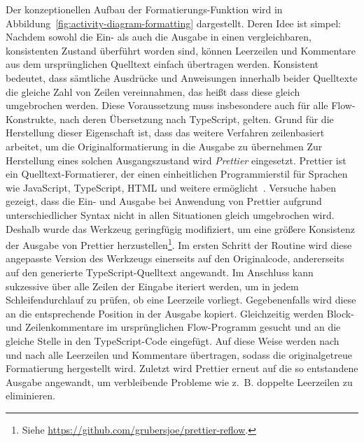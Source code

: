 Der konzeptionellen Aufbau der Formatierungs-Funktion wird in Abbildung~\ref{fig:activity-diagram-formatting} dargestellt. Deren Idee ist simpel: Nachdem sowohl die Ein- als auch die Ausgabe in einen vergleichbaren, konsistenten Zustand überführt worden sind, können Leerzeilen und Kommentare aus dem ursprünglichen Quelltext einfach übertragen werden. Konsistent bedeutet, dass sämtliche Ausdrücke und Anweisungen innerhalb beider Quelltexte die gleiche Zahl von Zeilen vereinnahmen, das heißt dass diese gleich umgebrochen werden. Diese Voraussetzung muss insbesondere auch für alle Flow-Konstrukte, nach deren Übersetzung nach TypeScript, gelten.
Grund für die Herstellung dieser Eigenschaft ist, dass das weitere Verfahren zeilenbasiert arbeitet, um die Originalformatierung in die Ausgabe zu übernehmen
Zur Herstellung eines solchen Ausgangszustand wird \textit{Prettier} eingesetzt. Prettier ist ein Quelltext-Formatierer, der einen einheitlichen Programmierstil für Sprachen wie JavaScript, TypeScript, HTML und weitere ermöglicht~\autocite{SOFTWARE:PRETTIER}.
Versuche haben gezeigt, dass die Ein- und Ausgabe bei Anwendung von Prettier aufgrund unterschiedlicher Syntax nicht in allen Situationen gleich umgebrochen wird. Deshalb wurde das Werkzeug geringfügig modifiziert, um eine größere Konsistenz der Ausgabe von Prettier herzustellen\footnote{Siehe \url{https://github.com/grubersjoe/prettier-reflow}.}.
Im ersten Schritt der Routine wird diese angepasste Version des Werkzeugs einerseits auf den Originalcode, andererseits auf den generierte TypeScript-Quelltext angewandt. Im Anschluss kann sukzessive über alle Zeilen der Eingabe iteriert werden, um in jedem Schleifendurchlauf zu prüfen, ob eine Leerzeile vorliegt. Gegebenenfalls wird diese an die entsprechende Position in der Ausgabe kopiert. Gleichzeitig werden Block- und Zeilenkommentare im ursprünglichen Flow-Programm gesucht und an die gleiche Stelle in den TypeScript-Code eingefügt. Auf diese Weise werden nach und nach alle Leerzeilen und Kommentare übertragen, sodass die originalgetreue Formatierung hergestellt wird. Zuletzt wird Prettier erneut auf die so entstandene Ausgabe angewandt, um verbleibende Probleme wie z.~B. doppelte Leerzeilen zu eliminieren.

